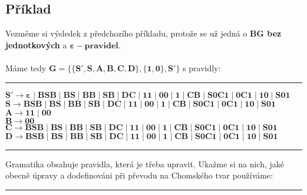 \documentclass{report}
\begin{document}
\subsection*{Příklad}
Vezměme si výsledek z předchozího příkladu, protože se už jedná o \textbf{BG bez jednotkových} a $\mathbf{\varepsilon-pravidel}$.\\ \\
Máme tedy $\mathbf{G=\{\{S',S,A,B,C,D\},\{1,0\},S'\}}$ s pravidly:
\vspace{0.4cm}    
\hrule
\vspace{0.1cm}
\begin{description}
    \item[$\mathbf{S' \rightarrow \varepsilon \mid BSB \mid BS \mid BB \mid SB \mid DC \mid  11 \mid 00 \mid 1 \mid  CB \mid S0C1 \mid 0C1 \mid 10 \mid S01}$]
    \item[$\mathbf{S \rightarrow BSB \mid BS \mid BB \mid SB \mid DC \mid  11 \mid 00 \mid 1 \mid  CB \mid S0C1 \mid 0C1 \mid 10 \mid S01 }$]
    \item[$\mathbf{A \rightarrow 11 \mid 00}$]
    \item[$\mathbf{B \rightarrow 00}$]
    \item[$\mathbf{C \rightarrow BSB \mid BS \mid BB \mid SB \mid DC \mid  11 \mid 00 \mid 1 \mid  CB \mid S0C1 \mid 0C1 \mid 10 \mid S01 }$]
    \item[$\mathbf{D \rightarrow BSB \mid BS \mid BB \mid SB \mid DC \mid  11 \mid 00 \mid 1 \mid  CB \mid S0C1 \mid 0C1 \mid 10 \mid S01 }$]
\end{description}
\vspace{0.1cm}    
\hrule
\vspace{0.4cm}
Gramatika obsahuje pravidla, která je třeba upravit. Ukažme si na nich, jaké obecně úpravy a dodefinováni při převodu na Chomského tvar používáme:
\vspace{0.4cm}    
\hrule
\vspace{0.1cm}
\end{document}
